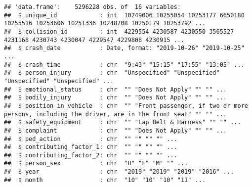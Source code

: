 \documentclass[
]{article}
\newenvironment{Shaded}{\begin{snugshade}}{\end{snugshade}}
\newcommand{\AttributeTok}[1]{\textcolor[rgb]{0.13,0.29,0.53}{#1}}
\newcommand{\CommentTok}[1]{\textcolor[rgb]{0.56,0.35,0.01}{\textit{#1}}}
\newcommand{\FunctionTok}[1]{\textcolor[rgb]{0.13,0.29,0.53}{\textbf{#1}}}
\newcommand{\NormalTok}[1]{#1}
\newcommand{\OtherTok}[1]{\textcolor[rgb]{0.56,0.35,0.01}{#1}}
\newcommand{\SpecialCharTok}[1]{\textcolor[rgb]{0.81,0.36,0.00}{\textbf{#1}}}
\newcommand{\StringTok}[1]{\textcolor[rgb]{0.31,0.60,0.02}{#1}}
\begin{document}
\begin{Shaded}
\end{Shaded}

\begin{verbatim}
## 'data.frame':    5296228 obs. of  16 variables:
##  $ unique_id            : int  10249006 10255054 10253177 6650180 10255516 10253606 10251336 10248708 10250179 10253792 ...
##  $ collision_id         : int  4229554 4230587 4230550 3565527 4231168 4230743 4230047 4229547 4229808 4230915 ...
##  $ crash_date           : Date, format: "2019-10-26" "2019-10-25" ...
##  $ crash_time           : chr  "9:43" "15:15" "17:55" "13:05" ...
##  $ person_injury        : chr  "Unspecified" "Unspecified" "Unspecified" "Unspecified" ...
##  $ emotional_status     : chr  "" "Does Not Apply" "" "" ...
##  $ bodily_injury        : chr  "" "Does Not Apply" "" "" ...
##  $ position_in_vehicle  : chr  "" "Front passenger, if two or more persons, including the driver, are in the front seat" "" "" ...
##  $ safety_equipment     : chr  "" "Lap Belt & Harness" "" "" ...
##  $ complaint            : chr  "" "Does Not Apply" "" "" ...
##  $ ped_action           : chr  "" "" "" "" ...
##  $ contributing_factor_1: chr  "" "" "" "" ...
##  $ contributing_factor_2: chr  "" "" "" "" ...
##  $ person_sex           : chr  "U" "F" "M" "" ...
##  $ year                 : chr  "2019" "2019" "2019" "2016" ...
##  $ month                : chr  "10" "10" "10" "11" ...
\end{verbatim}
\end{document}
